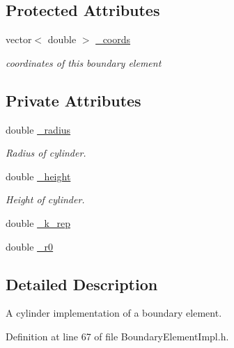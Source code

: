 \subsection*{Protected Attributes}
\begin{DoxyCompactItemize}
\item 
vector$<$ double $>$ \hyperlink{classBoundaryElement_ab51302e10e3e2def98438234ba5bf801}{\+\_\+coords}
\begin{DoxyCompactList}\small\item\em coordinates of this boundary element \end{DoxyCompactList}\end{DoxyCompactItemize}
\subsection*{Private Attributes}
\begin{DoxyCompactItemize}
\item 
double \hyperlink{classCylindricalZBoundaryElement_a09b2855b82606ae98f56e70eca516873}{\+\_\+radius}
\begin{DoxyCompactList}\small\item\em Radius of cylinder. \end{DoxyCompactList}\item 
double \hyperlink{classCylindricalZBoundaryElement_a5227f1150dc1a7dc212cfd4387e523fc}{\+\_\+height}
\begin{DoxyCompactList}\small\item\em Height of cylinder. \end{DoxyCompactList}\item 
double \hyperlink{classCylindricalZBoundaryElement_a4cdd06d2f2f1ac84e0ef6872c812b6cc}{\+\_\+k\+\_\+rep}
\item 
double \hyperlink{classCylindricalZBoundaryElement_a62b5ad9130b1cdeaa17ea3beaad760ef}{\+\_\+r0}
\end{DoxyCompactItemize}


\subsection{Detailed Description}
A cylinder implementation of a boundary element. 

Definition at line 67 of file Boundary\+Element\+Impl.\+h.



